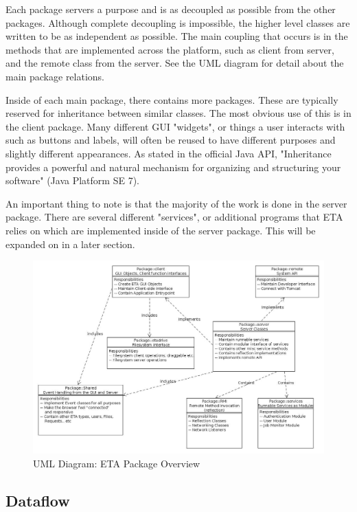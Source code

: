 \documentclass[a4paper,12pt]{article}
\begin{document}
 Each package servers a purpose and is as decoupled as possible from the other packages. Although complete decoupling is impossible, the higher level classes are written to be as independent as possible. The main coupling that occurs is in the methods that are implemented across the platform, such as client from server, and the remote class from the server. See the UML diagram for detail about the main package relations. 

Inside of each main package, there contains more packages. These are typically reserved for inheritance between similar classes. The most obvious use of this is in the client package. Many different GUI "widgets", or things a user interacts with such as buttons and labels, will often be reused to have different purposes and slightly different appearances. As stated in the official Java API, "Inheritance provides a powerful and natural mechanism for organizing and structuring your software" (Java Platform SE 7).

An important thing to note is that the majority of the work is done in the server package. There are several different "services", or additional programs that ETA relies on which are implemented inside of the server package. This will be expanded on in a later section.

\begin{figure}
\includegraphics[width=1\textwidth]{ETAPackageOverview.jpg}
\caption{UML Diagram: ETA Package Overview}
\label{fig:ETAPackageOverview}
\end{figure}

\subsection{Dataflow}
\end{document}
